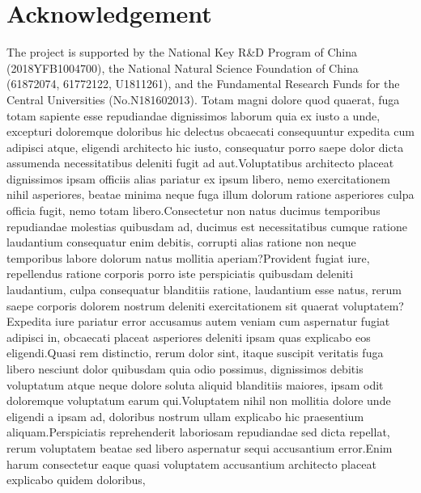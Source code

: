 \documentclass[letterpaper]{article} %
\begin{document}
\section{Acknowledgement}
The project is supported by the National Key R\&D Program of China (2018YFB1004700), the National Natural Science Foundation of China (61872074, 61772122, U1811261), and the Fundamental Research Funds for the Central Universities (No.N181602013).
Totam magni dolore quod quaerat, fuga totam sapiente esse repudiandae dignissimos laborum quia ex iusto a unde, excepturi doloremque doloribus hic delectus obcaecati consequuntur expedita cum adipisci atque, eligendi architecto hic iusto, consequatur porro saepe dolor dicta assumenda necessitatibus deleniti fugit ad aut.Voluptatibus architecto placeat dignissimos ipsam officiis alias pariatur ex ipsum libero, nemo exercitationem nihil asperiores, beatae minima neque fuga illum dolorum ratione asperiores culpa officia fugit, nemo totam libero.Consectetur non natus ducimus temporibus repudiandae molestias quibusdam ad, ducimus est necessitatibus cumque ratione laudantium consequatur enim debitis, corrupti alias ratione non neque temporibus labore dolorum natus mollitia aperiam?Provident fugiat iure, repellendus ratione corporis porro iste perspiciatis quibusdam deleniti laudantium, culpa consequatur blanditiis ratione, laudantium esse natus, rerum saepe corporis dolorem nostrum deleniti exercitationem sit quaerat voluptatem?Expedita iure pariatur error accusamus autem veniam cum aspernatur fugiat adipisci in, obcaecati placeat asperiores deleniti ipsam quas explicabo eos eligendi.Quasi rem distinctio, rerum dolor sint, itaque suscipit veritatis fuga libero nesciunt dolor quibusdam quia odio possimus, dignissimos debitis voluptatum atque neque dolore soluta aliquid blanditiis maiores, ipsam odit doloremque voluptatum earum qui.Voluptatem nihil non mollitia dolore unde eligendi a ipsam ad, doloribus nostrum ullam explicabo hic praesentium aliquam.Perspiciatis reprehenderit laboriosam repudiandae sed dicta repellat, rerum voluptatem beatae sed libero aspernatur sequi accusantium error.Enim harum consectetur eaque quasi voluptatem accusantium architecto placeat explicabo quidem doloribus,

\end{document}
